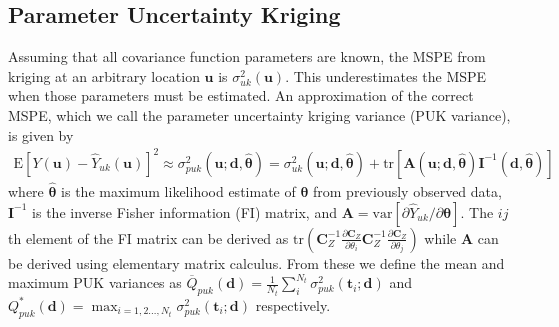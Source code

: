 \documentclass[cmbright]{staauth}
\newcommand{\var}{\mathrm{var}}
\newcommand{\E}{\mathrm{E}}
\newcommand{\tr}{\mathrm{tr}}
\begin{document}
\subsection{Parameter Uncertainty Kriging}
Assuming that all covariance function parameters are known, the MSPE from kriging at an arbitrary location $\bm{u}$ is $\sigma_{uk}^2(\bm{u})$. This underestimates the MSPE when those parameters must be estimated. An approximation of the correct MSPE, which we call the parameter uncertainty kriging variance (PUK variance), is given by \citep{zimmerman1992mean,abt1999estimating}
\begin{align*}
\E[Y(\bm{u}) - \widehat{Y}_{uk}(\bm{u})]^2 \approx \sigma^2_{puk}(\bm{u};\bm{d},\widehat{\bm{\theta}}) = \sigma^2_{uk}(\bm{u};\bm{d},\widehat{\bm{\theta}}) + \tr[\bm{A}(\bm{u};\bm{d},\widehat{\bm{\theta}})\bm{I}^{-1}(\bm{d},\widehat{\bm{\theta}})]
\end{align*}
where $\widehat{\bm{\theta}}$ is the maximum likelihood estimate of $\bm{\theta}$ from previously observed data, $\bm{I}^{-1}$ is the inverse Fisher information (FI) matrix, and $\bm{A} = \var[\partial \widehat{Y}_{uk} /\partial \bm{\theta}]$. The $ij$th element of the FI matrix can be derived as $\tr\left(\bm{C}_Z^{-1}\frac{\partial\bm{C}_Z}{\partial\theta_i}\bm{C}_Z^{-1}\frac{\partial\bm{C}_Z}{\partial\theta_j}\right)$ while $\bm{A}$ can be derived using elementary matrix calculus. From these we define the mean and maximum  PUK variances as $\overline{Q}_{puk}(\bm{d}) = \frac{1}{N_t}\sum_{i}^{N_t}\sigma^2_{puk}(\bm{t}_i;\bm{d})$ and $Q_{puk}^*(\bm{d}) = \max_{i=1,2\dots,N_t}\sigma^2_{puk}(\bm{t}_i;\bm{d})$ respectively.

\end{document}
